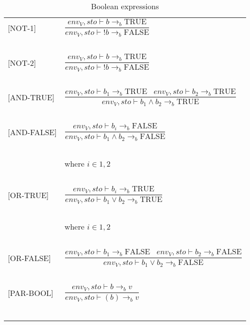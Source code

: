 \begin{longtable}{l l}
[NOT-1] & $\dfrac{env_V, sto \vdash b \rightarrow_b \text{TRUE}}{env_V, sto \vdash !b \rightarrow_b \text{FALSE}}$ \\
~ & ~ \\

[NOT-2] & $\dfrac{env_V, sto \vdash b \rightarrow_b \text{TRUE}}{env_V, sto \vdash !b \rightarrow_b \text{FALSE}}$ \\
~ & ~ \\

[AND-TRUE] & $\dfrac{env_V, sto \vdash b_1 \rightarrow_b \text{TRUE} \; \; \; env_V, sto \vdash b_2 \rightarrow_b \text{TRUE}}{env_V, sto \vdash b_1 \wedge b_2 \rightarrow_b \text{TRUE}}$ \\
~ & ~ \\

[AND-FALSE] & $\dfrac{env_V, sto \vdash b_i \rightarrow_b \text{FALSE}}{env_V, sto \vdash b_1 \wedge b_2 \rightarrow_b \text{FALSE}}$ \\
~ & ~ \\
~ & \indent\indent where $i \in {1,2}$ \\
~ & ~ \\

[OR-TRUE] & $\dfrac{env_V, sto \vdash b_i \rightarrow_b \text{TRUE}}{env_V, sto \vdash b_1 \vee b_2 \rightarrow_b \text{TRUE}}$ \\
~ & ~ \\
~ & \indent\indent where $i \in {1,2}$ \\
~ & ~ \\

[OR-FALSE] & $\dfrac{env_V, sto \vdash b_1 \rightarrow_b \text{FALSE} \; \; \; env_V, sto \vdash b_2 \rightarrow_b \text{FALSE}}{env_V, sto \vdash b_1 \vee b_2 \rightarrow_b \text{FALSE}}$ \\
~ & ~ \\

[PAR-BOOL] & $\dfrac{env_V, sto \vdash b \rightarrow_b v}{env_V, sto \vdash (b) \rightarrow_b v}$ \\
~ & ~ \\
\caption{Boolean expressions}
\end{longtable}

